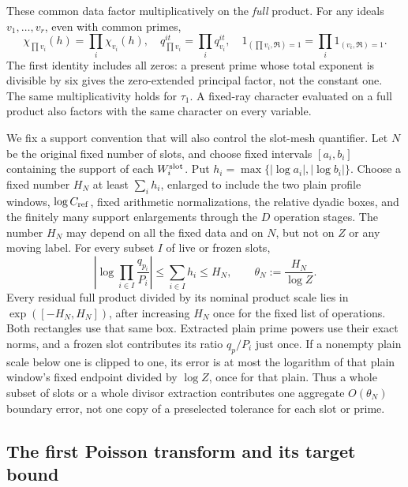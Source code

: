 \documentclass[12pt]{article}
\begin{document}
These common data factor multiplicatively on the \emph{full} product.
For any ideals \(v_1,\ldots,v_r\), even with common primes,
\[
 \chi_{\prod v_i}(h)=\prod_i\chi_{v_i}(h),\quad
 q_{\prod v_i}^{it}=\prod_iq_{v_i}^{it},\quad
 1_{(\prod v_i,\mathfrak R)=1}
   =\prod_i1_{(v_i,\mathfrak R)=1}.
\]
The first identity includes all zeros: a present prime whose total
exponent is divisible by six gives the zero-extended principal
factor, not the constant one.  The same multiplicativity holds for
\(\tau_1\).  A fixed-ray character evaluated on a full product also
factors with the same character on every variable.

We fix a support convention that will also control the slot-mesh
quantifier.  Let \(N\) be the original fixed number of slots, and
choose fixed intervals \([a_i,b_i]\) containing the support of each
\(W_i^{\rm slot}\).  Put
\(h_i=\max\{|\log a_i|,|\log b_i|\}\).  Choose a fixed number
\(H_N\) at least \(\sum_i h_i\), enlarged to include the two plain
profile windows, \(\log C_{\rm ref}\), fixed arithmetic normalizations, the relative dyadic
boxes, and the finitely many support enlargements through the \(D\)
operation stages.  The number \(H_N\) may depend on all the fixed
data and on \(N\), but not on \(Z\) or any moving label.  For every
subset \(I\) of live or frozen slots,
\begin{equation}
 \left|\log\prod_{i\in I}\frac{q_{p_i}}{P_i}\right|
 \le\sum_{i\in I}h_i\le H_N,
 \qquad \theta_N:=\frac{H_N}{\log Z}.
 \label{eq:centered-aggregate-support}
\end{equation}
Every residual full product divided by its nominal product scale lies
in \(\exp([-H_N,H_N])\), after increasing \(H_N\) once for the
fixed list of operations.  Both rectangles use that same box.  Extracted
plain prime powers use their exact norms, and a frozen slot contributes
its ratio \(q_p/P_i\) just once.  If a nonempty plain scale below one
is clipped to one, its error is at most the logarithm of that plain
window's fixed endpoint divided by \(\log Z\), once for that plain.
Thus a whole subset of slots or a whole divisor extraction contributes
one aggregate \(O(\theta_N)\) boundary error, not one copy of a
preselected tolerance for each slot or prime.

\subsection{The first Poisson transform and its target bound}\label{sec:plain-first-transform}
\end{document}
